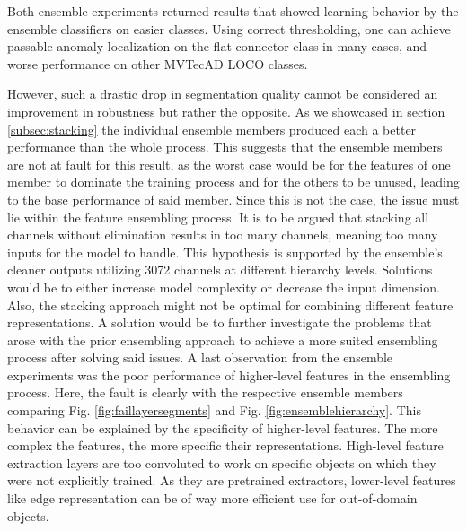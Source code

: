 Both ensemble experiments returned results that showed learning behavior by the ensemble classifiers on easier classes. Using correct thresholding, one can achieve passable 
anomaly localization on the flat connector class in many cases, and worse performance on other MVTecAD LOCO \cite{LOCODentsAndScratchesBergmann2022} classes.

However, such a drastic drop in segmentation quality cannot be considered an improvement in robustness but rather the opposite. As we showcased in 
section \ref{subsec:stacking} the individual ensemble members produced each a better performance than the whole process. 
This suggests that the ensemble members are not at fault for this result, as the worst case would be for the features of one member to dominate the training process 
and for the others to be unused, leading to the base performance of said member. Since this is not the case, the issue must lie within the feature ensembling process. 
It is to be argued that stacking all channels without elimination results in too many channels, meaning too many inputs for the model to handle. This hypothesis is 
supported by the ensemble's cleaner outputs utilizing 3072 channels at different hierarchy levels. Solutions would be to either 
increase model complexity or decrease the input dimension. Also, the stacking approach might not be optimal for combining different feature representations. 
A solution would be to further investigate the problems that arose with the prior ensembling approach to achieve a more suited ensembling process after solving said 
issues. \newline 
A last observation from the ensemble experiments was the poor performance of higher-level features in the ensembling process. 
Here, the fault is clearly with the respective ensemble members comparing Fig. \ref{fig:faillayersegments} and Fig. \ref{fig:ensemblehierarchy}. This behavior can be explained 
by the specificity of higher-level features. The more complex the features, the more specific their representations. High-level feature extraction layers are too 
convoluted to work on specific objects on which they were not explicitly trained. As they are pretrained extractors, lower-level features like edge representation can be of way 
more efficient use for out-of-domain objects. \newline 





